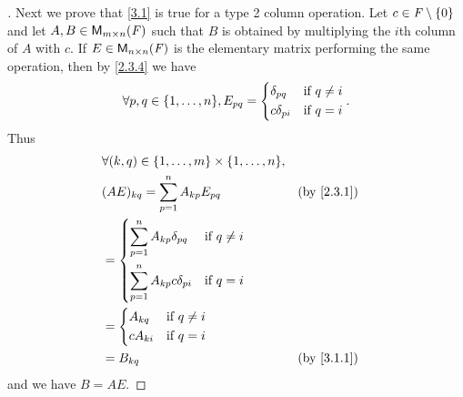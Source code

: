 \begin{proof}[]
	Next we prove that \cref{3.1} is true for a type 2 column operation.
	Let \(c \in \mathit{F} \setminus \left\lbrace0\right\rbrace\) and let \(A, B \in \ms\) such that \(B\) is obtained by multiplying the \(i\)th column of \(A\) with \(c\).
	If \(E \in \ms[n][n][\F]\) is the elementary matrix performing the same operation, then by \cref{2.3.4} we have
	\[
		\forall p, q \in \set{1, \dots, n}, E_{p q} = \begin{dcases}
			\delta_{p q}   & \text{if } q \neq i \\
			c \delta_{p i} & \text{if } q = i
		\end{dcases}.
	\]
	Thus
	\begin{align*}
		 & \forall (k, q) \in \set{1, \dots, m} \times \set{1, \dots, n},                 \\
		 & (AE)_{k q} = \sum_{p = 1}^n A_{k p} E_{p q}                    &  & \by{2.3.1} \\
		 & = \begin{dcases}
			     \sum_{p = 1}^n A_{k p} \delta_{p q}   & \text{if } q \neq i \\
			     \sum_{p = 1}^n A_{k p} c \delta_{p i} & \text{if } q = i
		     \end{dcases}                  \\
		 & = \begin{dcases}
			     A_{k q}   & \text{if } q \neq i \\
			     c A_{k i} & \text{if } q = i
		     \end{dcases}                                              \\
		 & = B_{k q}                                                      &  & \by{3.1.1}
	\end{align*}
	and we have \(B = AE\).


\end{proof}

